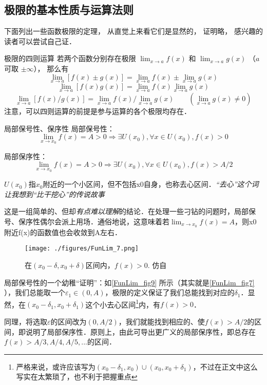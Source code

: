 \subsection{极限的基本性质与运算法则}
下面列出一些函数极限的定理， 从直觉上来看它们是显然的， 证明略， 感兴趣的读者可以尝试自己证．
\begin{theorem}{极限的四则运算}
若两个函数分别存在极限 $\lim_{x\to a} f(x)$ 和 $\lim_{x\to a} g(x)$ （$a$ 可取 $\pm \infty$）， 那么有
\begin{equation}
\lim_{x\to a} [f(x) \pm g(x)] = \lim_{x\to a}f(x) \pm  \lim_{x\to a} g(x)
\end{equation}
\begin{equation}
\lim_{x\to a} [f(x) g(x)] = \lim_{x\to a}f(x) \lim_{x\to a} g(x)
\end{equation}
\begin{equation}
\lim_{x\to a} [f(x)/g(x)] = \lim_{x\to a}f(x)/\lim_{x\to a} g(x) \qquad (\lim_{x\to a} g(x) \ne 0)
\end{equation}
注意，可以四则运算的前提是参与运算的各个极限均存在．
\end{theorem}

\begin{theorem}{局部保号性、保序性}
局部保号性：
$$\lim_{x\to x_0}f(x)=A>0\Rightarrow \exists U(x_0), \forall x \in U(x_0), f(x)>0$$

局部保序性：
$$\lim_{x\to x_0}f(x)=A>0 \Rightarrow \exists U(x_0), \forall x \in U(x_0), f(x)>A/2$$

$U(x_0)$指$x_0$附近的一个小区间，但不包括x0自身，也称去心区间．\textsl{“去心”这个词让我想到“比干挖心”的传说故事}

这是一组简单的、但却\textsl{有点难以理解}的结论．在处理一些刁钻的问题时，局部保号、保序性偶尔会派上用场．通俗地说，这意味着若$\lim_{x\to x_0}f(x)=A$，则x0附近f(x)的函数值也会收敛到A左右．

\begin{figure}[ht]
\centering
\texttt{[image: ./figures/FunLim\_7.png]}
\caption{在$(x_0-\delta, x_0+\delta)$区间内，$f(x)>0$. 仿自\cite{Thomas}} \label{FunLim_fig9}
\end{figure}
局部保号性的一个幼稚“证明”：如\autoref{FunLim_fig9} 所示（其实就是\autoref{FunLim_fig7} ），我们总能取一个$\varepsilon_1 \in (0,A)$，极限的定义保证了我们总能找到对应的$\delta_1$．显然，在$(x_0-\delta_1, x_0+\delta_1)$这个小去心区间\footnote{严格来说，或许应该写为$(x_0-\delta_1,x_0)\cup(x_0, x_0+\delta_1)$，不过在正文中这么写实在太繁琐了，也不利于把握重点}内，有$f(x)>0$．

同理，将选取$\varepsilon$的区间改为$(0,A/2)$，我们就能找到相应的、使$f(x)>A/2$的区间，即说明了局部保序性．原则上，由此可导出更广义的局部保序性，即总存在$f(x)>A/3,A/4,A/5,...$的区间．

\end{theorem}